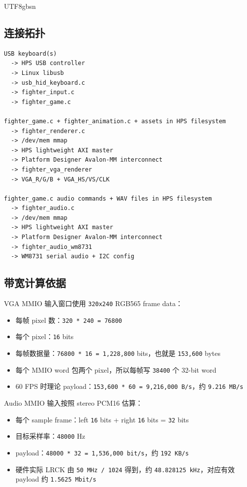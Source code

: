 \documentclass[12pt,a4paper]{article}
\begin{document}
\begin{CJK*}{UTF8}{gbsn}
\subsection{连接拓扑}

\begin{lstlisting}[style=fighterstyle]
USB keyboard(s)
  -> HPS USB controller
  -> Linux libusb
  -> usb_hid_keyboard.c
  -> fighter_input.c
  -> fighter_game.c

fighter_game.c + fighter_animation.c + assets in HPS filesystem
  -> fighter_renderer.c
  -> /dev/mem mmap
  -> HPS lightweight AXI master
  -> Platform Designer Avalon-MM interconnect
  -> fighter_vga_renderer
  -> VGA_R/G/B + VGA_HS/VS/CLK

fighter_game.c audio commands + WAV files in HPS filesystem
  -> fighter_audio.c
  -> /dev/mem mmap
  -> HPS lightweight AXI master
  -> Platform Designer Avalon-MM interconnect
  -> fighter_audio_wm8731
  -> WM8731 serial audio + I2C config
\end{lstlisting}

\subsection{带宽计算依据}

VGA MMIO 输入窗口使用 \texttt{320x240} RGB565 frame data：

\begin{itemize}
  \item 每帧 pixel 数：\texttt{320 * 240 = 76800}
  \item 每个 pixel：\texttt{16} bits
  \item 每帧数据量：\texttt{76800 * 16 = 1,228,800} bits，也就是 \texttt{153,600} bytes
  \item 每个 MMIO word 包两个 pixel，所以每帧写 \texttt{38400} 个 32-bit word
  \item 60 FPS 时理论 payload：\texttt{153,600 * 60 = 9,216,000 B/s}，约 \texttt{9.216 MB/s}
\end{itemize}

Audio MMIO 输入按照 stereo PCM16 估算：

\begin{itemize}
  \item 每个 sample frame：left \texttt{16} bits + right \texttt{16} bits = \texttt{32} bits
  \item 目标采样率：\texttt{48000} Hz
  \item payload：\texttt{48000 * 32 = 1,536,000 bit/s}，约 \texttt{192 KB/s}
  \item 硬件实际 LRCK 由 \texttt{50 MHz / 1024} 得到，约 \texttt{48.828125 kHz}，对应有效 payload 约 \texttt{1.5625 Mbit/s}
\end{itemize}


\end{CJK*}
\end{document}
